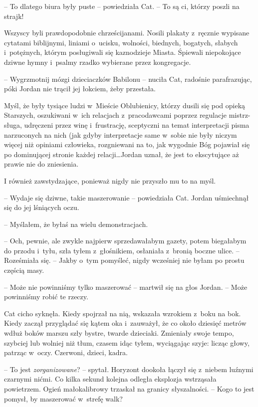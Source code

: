 \documentclass[oneside,polish,11pt,sfheadings]{mwbk}
\begin{document}
-- To dlatego biura były puste -- powiedziała Cat. -- To są ci, którzy
poszli na strajk!

Wszyscy byli prawdopodobnie chrześcijanami. Nosili plakaty z~ręcznie
wypisane cytatami biblijnymi, liniami o~ucisku, wolności, biednych,
bogatych, słabych i~potężnych, którym posługiwali się kaznodzieje
Miasta. Śpiewali niepokojące dziwne hymny i~psalmy rzadko wybierane
przez kongregacje.

-- Wygrzmotnij mózgi dzieciaczków Babilonu -- nuciła Cat, radośnie
parafrazując, póki Jordan nie trącił jej łokciem, żeby przestała.

Myśl, że były tysiące ludzi w~Mieście Oblubienicy, którzy dusili się pod
opieką Starszych, oszukiwani w~ich relacjach z~pracodawcami poprzez
regulacje mistrz-sługa, udręczeni przez winę i~frustrację, sceptyczni na
temat interpretacji pisma narzuconych na nich (jak gdyby interpretacje
same w~sobie nie były niczym więcej niż opiniami człowieka, rozgniewani
na to, jak wygodnie Bóg pojawiał się po dominującej stronie każdej
relacji\ldots Jordan uznał, że jest to ekscytujące aż prawie nie do
zniesienia.

I również zawstydzające, ponieważ nigdy nie przyszło mu to na myśl.

-- Wydaje się dziwne, takie maszerowanie -- powiedziała Cat. Jordan
uśmiechnął się do jej lśniących oczu.

-- Myślałem, że byłaś na wielu demonstracjach.

-- Och, pewnie, ale zwykle najpierw sprzedawałabym gazety, potem
biegałabym do przodu i~tyłu, szła tyłem z~głośnikiem, osłaniała z~bronią
boczne ulice. -- Roześmiała się. -- Jakby o~tym pomyśleć, nigdy wcześniej
nie byłam po prostu częścią masy.

-- Może nie powinniśmy tylko maszerować -- martwił się na głos Jordan. -- Może powinniśmy robić te rzeczy.

Cat cicho syknęła. Kiedy spojrzał na nią, wskazała wzrokiem z~boku na
bok. Kiedy zaczął przyglądać się kątem oka i~zauważył, że co około
dziesięć metrów wdłuż boków marszu szły bystre, twarde dzieciaki.
Zmieniały swoje tempo, szybciej lub wolniej niż tłum, czasem idąc tyłem,
wyciągając szyje: licząc głowy, patrząc w~oczy. Czerwoni, dzieci, kadra.

-- To jest \emph{zorganizowane}? -- spytał. Horyzont dookoła łączył się z~niebem luźnymi czarnymi nićmi. Co kilka sekund kolejna odległa eksplozja
wstrząsała powietrzem. Ogień małokalibrowy trzaskał na granicy
słyszalności. -- Kogo to jest pomysł, by maszerować w~strefę walk?
\end{document}

